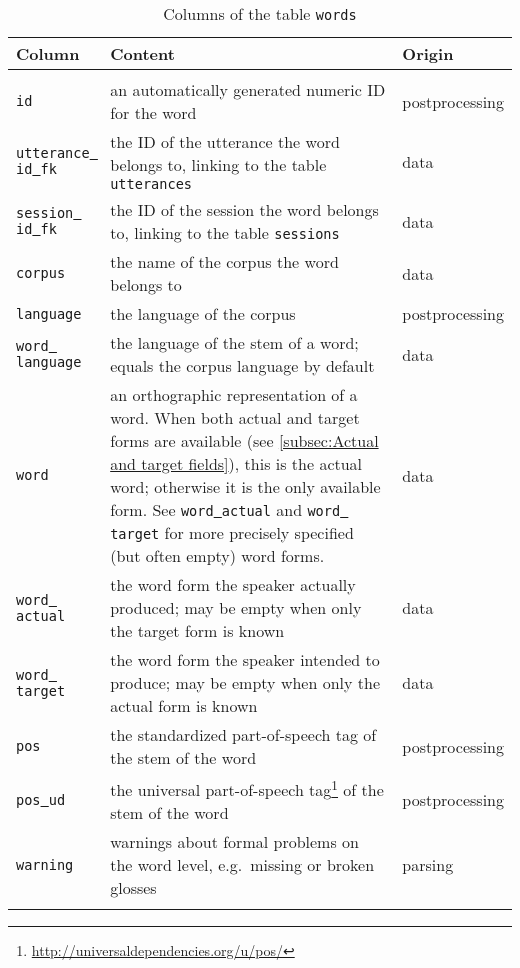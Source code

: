 \documentclass[a4paper, 11pt]{book}
\newcommand{\und}{\underline{{ }}\hspace{0.2mm}}	%
\begin{document}
\begin{longtable}{lp{.5\linewidth}p{.2\linewidth}}
	\toprule
		\textbf{Column} & \textbf{Content} 	& \textbf{Origin} \\
	\midrule
	\endhead
	
	\bottomrule\\[-0.15cm]
	\caption{Columns of the table \texttt{words}}
	\endfoot
	
		\texttt{id}	 				& an automatically generated numeric ID for the word & postprocessing \\
		\texttt{utterance\und id\und fk} & the ID of the utterance the word belongs to, linking to the table \texttt{utterances} & data \\
		\texttt{session\und id\und fk} & the ID of the session the word belongs to, linking to the table \texttt{sessions} & data \\
		\texttt{corpus} 			& the name of the corpus the word belongs to & data \\ 
		\texttt{language}			& the language of the corpus & postprocessing \\
		\texttt{word\und language}	& the language of the stem of a word; equals the corpus language by default & data \\							  
		\texttt{word}				& an orthographic representation of a word. When both actual and target forms are available 
									  (see \autoref{subsec:Actual and target fields}), this is the actual word; otherwise it is the only available form. 
									  See \texttt{word\und actual} and \texttt{word\und target} for more precisely specified (but often empty) word forms. & data \\
		\texttt{word\und actual}	& the word form the speaker actually produced; may be empty when only the target form is known & data \\
		\texttt{word\und target}	& the word form the speaker intended to produce; may be empty when only the actual form is known & data \\
		\texttt{pos}				& the standardized part-of-speech tag of the stem of the word & postprocessing \\
		\texttt{pos\und ud}       &  the universal part-of-speech tag\footnote{\url{http://universaldependencies.org/u/pos/}} of the stem of the word & postprocessing \\
		\texttt{warning}			& warnings about formal problems on the word level, e.g.\ missing or broken glosses & parsing \\

	\label{tab:Table words}
\end{longtable}
\end{document}
